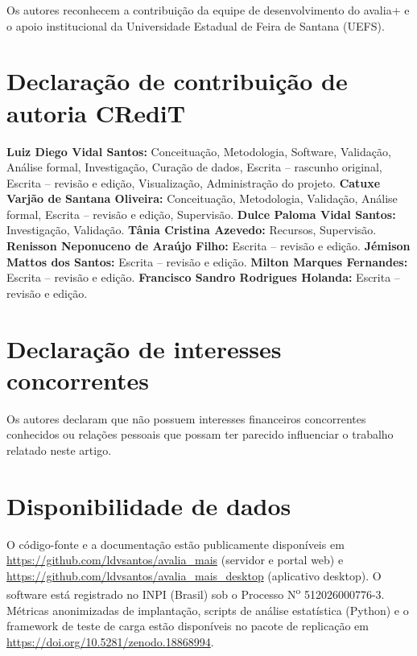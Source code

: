 \documentclass[preprint,12pt,a4paper]{elsarticle}
\begin{document}
Os autores reconhecem a contribuição da equipe de desenvolvimento do avalia+ e o apoio institucional da Universidade Estadual de Feira de Santana (UEFS).

\section*{Declaração de contribuição de autoria CRediT}

\textbf{Luiz Diego Vidal Santos:} Conceituação, Metodologia, Software, Validação, Análise formal, Investigação, Curação de dados, Escrita -- rascunho original, Escrita -- revisão e edição, Visualização, Administração do projeto. \textbf{Catuxe Varjão de Santana Oliveira:} Conceituação, Metodologia, Validação, Análise formal, Escrita -- revisão e edição, Supervisão. \textbf{Dulce Paloma Vidal Santos:} Investigação, Validação. \textbf{Tânia Cristina Azevedo:} Recursos, Supervisão. \textbf{Renisson Neponuceno de Araújo Filho:} Escrita -- revisão e edição. \textbf{Jémison Mattos dos Santos:} Escrita -- revisão e edição. \textbf{Milton Marques Fernandes:} Escrita -- revisão e edição. \textbf{Francisco Sandro Rodrigues Holanda:} Escrita -- revisão e edição.

\section*{Declaração de interesses concorrentes}

Os autores declaram que não possuem interesses financeiros concorrentes conhecidos ou relações pessoais que possam ter parecido influenciar o trabalho relatado neste artigo.

\section*{Disponibilidade de dados}

O código-fonte e a documentação estão publicamente disponíveis em \url{https://github.com/ldvsantos/avalia_mais} (servidor e portal web) e \url{https://github.com/ldvsantos/avalia_mais_desktop} (aplicativo desktop). O software está registrado no INPI (Brasil) sob o Processo N\textsuperscript{o} 512026000776-3. Métricas anonimizadas de implantação, scripts de análise estatística (Python) e o framework de teste de carga estão disponíveis no pacote de replicação em \url{https://doi.org/10.5281/zenodo.18868994}.
\end{document}
